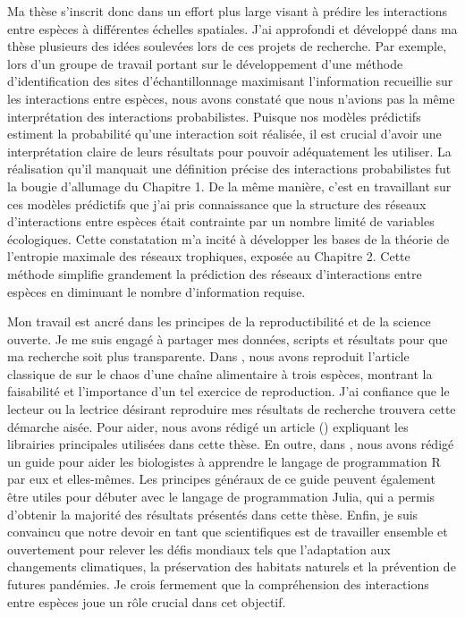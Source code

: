 \documentclass[12pt,twoside,phd]{dms}
\numberwithin{equation}{section}
\numberwithin{table}{chapter}
\numberwithin{figure}{chapter}
\begin{document}
Ma thèse s'inscrit donc dans un effort plus large visant à prédire les
interactions entre espèces à différentes échelles spatiales. J'ai approfondi et
développé dans ma thèse plusieurs des idées soulevées lors de ces projets de
recherche. Par exemple, lors d'un groupe de travail portant sur le développement
d'une méthode d'identification des sites d'échantillonnage maximisant
l'information recueillie sur les interactions entre espèces, nous avons constaté
que nous n'avions pas la même interprétation des interactions probabilistes.
Puisque nos modèles prédictifs estiment la probabilité qu'une interaction soit
réalisée, il est crucial d'avoir une interprétation claire de leurs résultats
pour pouvoir adéquatement les utiliser. La réalisation qu'il manquait une
définition précise des interactions probabilistes fut la bougie d'allumage du
Chapitre 1. De la même manière, c'est en travaillant sur ces modèles prédictifs
que j'ai pris connaissance que la structure des réseaux d'interactions entre
espèces était contrainte par un nombre limité de variables écologiques. Cette
constatation m'a incité à développer les bases de la théorie de l'entropie
maximale des réseaux trophiques, exposée au Chapitre 2. Cette méthode simplifie
grandement la prédiction des réseaux d'interactions entre espèces en diminuant
le nombre d'information requise. 

Mon travail est ancré dans les principes de la reproductibilité et de la science
ouverte. Je me suis engagé à partager mes données, scripts et résultats pour que
ma recherche soit plus transparente. Dans \cite{Dansereau2020Re}, nous avons
reproduit l'article classique de \cite{Hastings1991Chaos} sur le chaos d'une
chaîne alimentaire à trois espèces, montrant la faisabilité et l'importance d'un
tel exercice de reproduction. J'ai confiance que le lecteur ou la lectrice
désirant reproduire mes résultats de recherche trouvera cette démarche aisée.
Pour aider, nous avons rédigé un article (\cite{Banville2021Mangal}) expliquant
les librairies principales utilisées dans cette thèse. En outre, dans
\cite{Lawlor2022Ten}, nous avons rédigé un guide pour aider les biologistes à
apprendre le langage de programmation R par eux et elles-mêmes. Les principes
généraux de ce guide peuvent également être utiles pour débuter avec le
langage de programmation Julia, qui a permis d'obtenir la majorité des résultats
présentés dans cette thèse. Enfin, je suis convaincu que notre devoir en tant
que scientifiques est de travailler ensemble et ouvertement pour relever les
défis mondiaux tels que l'adaptation aux changements climatiques, la
préservation des habitats naturels et la prévention de futures pandémies. Je
crois fermement que la compréhension des interactions entre espèces joue un rôle
crucial dans cet objectif. 
\end{document}

